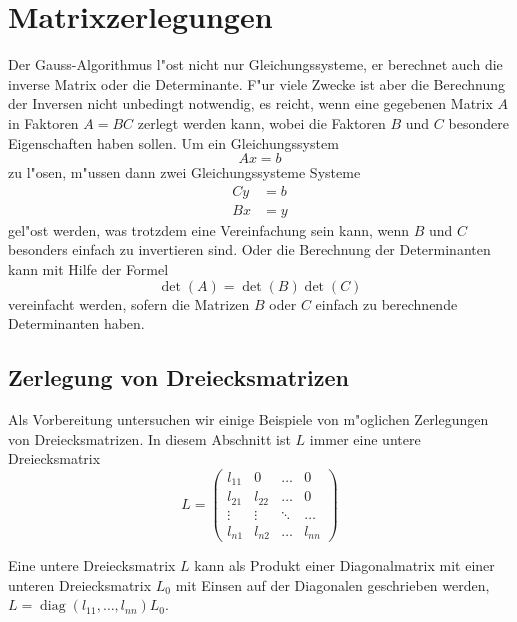 %
%
%
\chapter{Matrixzerlegungen\label{chapter-zerlegung}}
Der Gauss-Algorithmus l"ost nicht nur Gleichungssysteme, er berechnet
auch die inverse Matrix oder die Determinante.
F"ur viele Zwecke ist
aber die Berechnung der Inversen nicht unbedingt notwendig, es reicht,
wenn eine gegebenen Matrix $A$ in Faktoren $A=BC$ zerlegt werden kann,
wobei die Faktoren $B$ und $C$ besondere Eigenschaften haben sollen.
Um ein Gleichungssystem
\[
Ax=b
\]
zu l"osen, m"ussen dann zwei Gleichungssysteme Systeme
\begin{align*}
Cy&=b\\
Bx&=y
\end{align*}
gel"ost werden, was trotzdem eine Vereinfachung sein kann, wenn
$B$ und $C$ besonders einfach zu invertieren sind.
Oder die Berechnung der Determinanten kann mit Hilfe der Formel
\[
\det(A)=\det(B)\det(C)
\]
vereinfacht werden, sofern die Matrizen $B$ oder $C$ einfach
zu berechnende Determinanten haben.

\section{Zerlegung von Dreiecksmatrizen}
Als Vorbereitung untersuchen wir einige Beispiele von m"oglichen
Zerlegungen von Dreiecksmatrizen.
In diesem Abschnitt ist $L$ immer eine untere Dreiecksmatrix
\[
L=\begin{pmatrix}
l_{11}&0     &\dots &0     \\
l_{21}&l_{22}&\dots &0     \\
\vdots&\vdots&\ddots&\dots \\
l_{n1}&l_{n2}&\dots &l_{nn}
\end{pmatrix}
\]
\begin{hilfssatz}
Eine untere Dreiecksmatrix $L$ kann als Produkt einer Diagonalmatrix
mit einer unteren Dreiecksmatrix $L_0$ mit Einsen auf der Diagonalen
geschrieben werden, $L=\operatorname{diag}(l_{11},\dots,l_{nn}) L_0$.
\end{hilfssatz}

